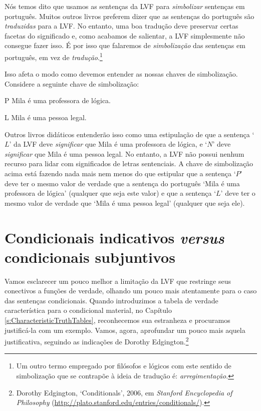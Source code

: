 Nós temos dito que usamos as sentenças da LVF para \emph{simbolizar} sentenças em português.
Muitos outros livros preferem dizer que as sentenças do português são \emph{traduzidas} para a LVF.
No entanto, uma boa tradução deve preservar certas facetas do significado e, como acabamos de salientar, a LVF simplesmente não consegue fazer isso.
É por isso que falaremos de \emph{simbolização} das sentenças em português, em vez de \emph{tradução}.\footnote{
Um outro termo empregado por filósofos e lógicos com este sentido de simbolização que se contrapõe à ideia de tradução é: \emph{arregimentação}.}

Isso afeta o modo como devemos entender as nossas chaves de simbolização.
Considere a seguinte chave de simbolização:
	\begin{ekey}
		\item[P] Mila é uma professora de lógica.
		\item[L] Mila é uma pessoa legal.
	\end{ekey}
Outros livros didáticos entenderão isso como uma estipulação de que a sentença `$L$' da LVF deve \emph{significar} que Mila é uma professora de lógica, e `$N$' deve \emph{significar} que Mila é uma pessoa legal.
No entanto, a LVF não possui nenhum recurso para lidar com significados de letras sentenciais.
A chave de simbolização acima está fazendo nada mais nem menos do que estipular que a sentença `$P$' deve ter o mesmo valor de verdade que a sentença do português `Mila é uma professora de lógica' (qualquer que seja este valor) e que a sentença `$L$' deve ter o mesmo valor de verdade que `Mila é uma pessoa legal' (qualquer que seja ele).

\section[Indicativo \emph{versus} subjuntivo]{Condicionais indicativos \emph{versus} condicionais subjuntivos}\label{s:IndicativeSubjunctive}
Vamos esclarecer um pouco melhor a limitação da LVF que restringe seus conectivos a funções de verdade, olhando um pouco mais atentamente para o caso das sentenças condicionais.
Quando introduzimos a tabela de verdade característica para o condicional material, no Capítulo \ref{s:CharacteristicTruthTables}, reconhecemos sua estranheza e procuramos justificá-la com um exemplo.
Vamos, agora, aprofundar um pouco mais aquela justificativa, seguindo as indicações de Dorothy Edgington.\footnote{Dorothy Edgington, `Conditionals', 2006, em \emph{Stanford Encyclopedia of Philosophy} (\url{http://plato.stanford.edu/entries/conditionals/}).} 

